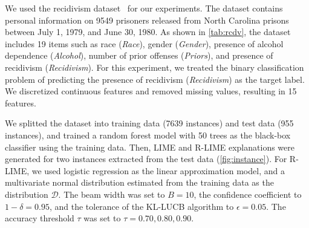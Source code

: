 \documentclass[runningheads]{llncs}
\begin{document}
We used the recidivism dataset~\cite{schmidt1988predicting} for our experiments.
The dataset contains personal information on 9549 prisoners released from
North Carolina prisons between July 1, 1979, and June 30, 1980.
As shown in \cref{tab:rcdv}, the dataset includes 19 items such as
race (\emph{Race}), gender (\emph{Gender}),
presence of alcohol dependence (\emph{Alcohol}),
number of prior offenses (\emph{Priors}),
and presence of recidivism (\emph{Recidivism}).
For this experiment,
we treated the binary classification problem of predicting
the presence of recidivism (\emph{Recidivism}) as the target label.
We discretized continuous features and removed missing values,
resulting in 15 features.

We splitted the dataset into training data (7639 instances) and test data (955 instances),
and trained a random forest model with 50 trees as the black-box classifier
using the training data.
Then, LIME and R-LIME explanations were generated
for two instances extracted from the test data (\cref{fig:instance}).
For R-LIME, we used logistic regression as the linear approximation model,
and a multivariate normal distribution estimated from the training data
as the distribution $\mathcal{D}$.
The beam width was set to $B=10$,
the confidence coefficient to $1-\delta=0.95$,
and the tolerance of the KL-LUCB algorithm to $\epsilon=0.05$.
The accuracy threshold $\tau$ was set to $\tau=0.70,0.80,0.90$.
\end{document}
